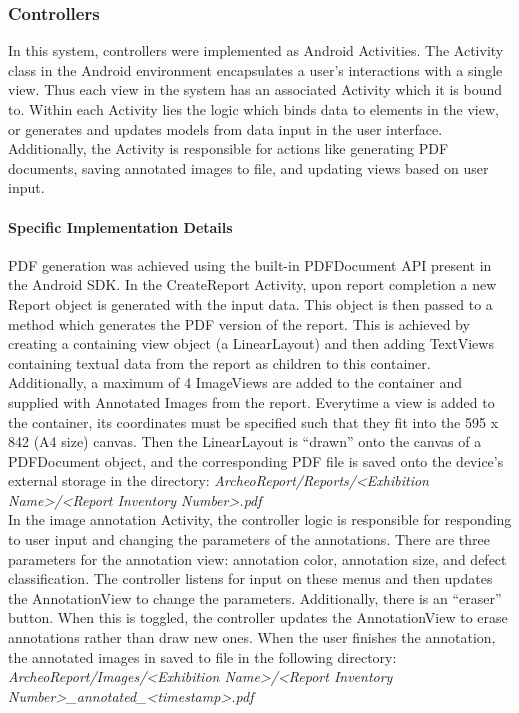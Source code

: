 \documentclass[12pt]{article}
\begin{document}
\subsubsection{Controllers}
\label{sec:Controllers}

In this system, controllers were implemented as Android Activities. The Activity class in the Android environment encapsulates a user's interactions with a single view. Thus each view in the system has an associated Activity which it is bound to. Within each Activity lies the logic which binds data to elements in the view, or generates and updates models from data input in the user interface. Additionally, the Activity is responsible for actions like generating PDF documents, saving annotated images to file, and updating views based on user input. 

\paragraph{Specific Implementation Details}
PDF generation was achieved using the built-in PDFDocument API present in the Android SDK. In the CreateReport Activity, upon report completion a new Report object is generated with the input data. This object is then passed to a method which generates the PDF version of the report. This is achieved by creating a containing view object (a LinearLayout) and then adding TextViews containing textual data from the report as children to this container. Additionally, a maximum of 4 ImageViews are added to the container and supplied with Annotated Images from the report. Everytime a view is added to the container, its coordinates must be specified such that they fit into the 595 x 842 (A4 size) canvas. Then the LinearLayout is ``drawn'' onto the canvas of a PDFDocument object, and the corresponding PDF file is saved onto the device's external storage in the directory: \textit{ArcheoReport/Reports/<Exhibition Name>/<Report Inventory Number>.pdf} \\

In the image annotation Activity, the controller logic is responsible for responding to user input and changing the parameters of the annotations. There are three parameters for the annotation view: annotation color, annotation size, and defect classification. The controller listens for input on these menus and then updates the AnnotationView to change the parameters. Additionally, there is an ``eraser'' button. When this is toggled, the controller updates the AnnotationView to erase annotations rather than draw new ones. When the user finishes the annotation, the annotated images in saved to file in the following directory: \textit{ArcheoReport/Images/<Exhibition Name>/<Report Inventory Number>\_annotated\_<timestamp>.pdf} \\
\end{document}
